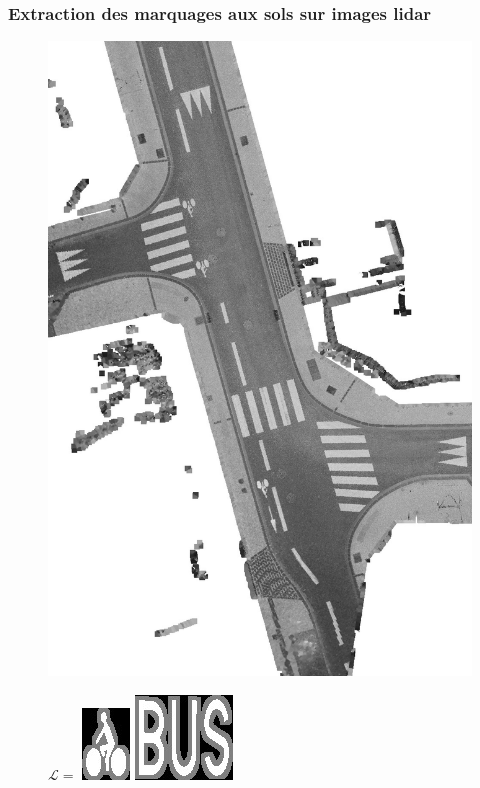 \documentclass{beamer}
\newcommand{\patternscale}{.3}
\newcommand{\patternspace}{1mm}
\begin{document}
\begin{frame}
\frametitle{Extraction des marquages aux sols sur images lidar}
\begin{center}
\begin{figure}[ht]
\includegraphics[angle = 90, width = .85\linewidth, scale = 0.7]{im_basis_crop_white}
\end{figure}
\begin{figure}[ht]$ \mathcal{L}=$
\includegraphics[scale = \patternscale]{patterns/1.jpg}\hspace*{\patternspace}
\includegraphics[scale = \patternscale]{patterns/2.jpg}\hspace*{\patternspace}

\end{figure}
\end{center}
\end{frame}
\end{document}
